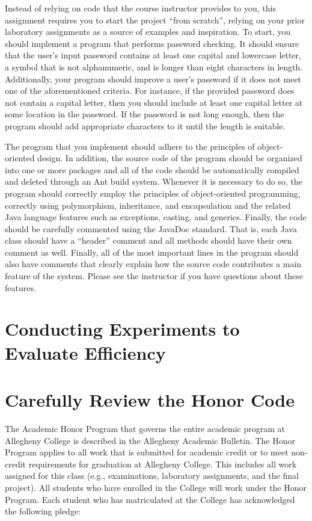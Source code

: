 Instead of relying on code that the course instructor provides to you, this assignment requires you to start the project
``from scratch'', relying on your prior laboratory assignments as a source of examples and inspiration. To start, you
should implement a program that performs password checking. It should ensure that the user's input password contains at
least one capital and lowercase letter, a symbol that is not alphanumeric, and is longer than eight characters in
length. Additionally, your program should improve a user's password if it does not meet one of the aforementioned
criteria. For instance, if the provided password does not contain a capital letter, then you should include at least one
capital letter at some location in the password. If the password is not long enough, then the program should add
appropriate characters to it until the length is suitable.

The program that you implement should adhere to the principles of object-oriented design. In addition, the source code
of the program should be organized into one or more packages and all of the code should be automatically compiled and
deleted through an Ant build system. Whenever it is necessary to do so, the program should correctly employ the
principles of object-oriented programming, correctly using polymorphism, inheritance, and encapsulation and the related
Java language features such as exceptions, casting, and generics. Finally, the code should be carefully commented using
the JavaDoc standard. That is, each Java class should have a ``header'' comment and all methods should have their own
comment as well. Finally, all of the most important lines in the program should also have comments that clearly explain
how the source code contributes a main feature of the system. Please see the instructor if you have questions about
these features.

\vspace*{-.05in}
\section*{Conducting Experiments to Evaluate Efficiency}
\vspace*{-.05in}

\section*{Carefully Review the Honor Code}

The Academic Honor Program that governs the entire academic program at Allegheny College is described in the Allegheny
Academic Bulletin.  The Honor Program applies to all work that is submitted for academic credit or to meet non-credit
requirements for graduation at Allegheny College.  This includes all work assigned for this class (e.g., examinations,
  laboratory assignments, and the final project).  All students who have enrolled in the College will work under the Honor
Program.  Each student who has matriculated at the College has acknowledged the following pledge:

